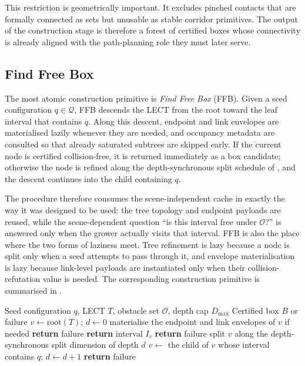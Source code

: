 \documentclass[journal]{IEEEtran}
\newcommand{\calO}{\ensuremath{\mathcal{O}}}
\newcommand{\Q}{\ensuremath{\mathcal{Q}}}
\begin{document}
This restriction is geometrically important. It excludes pinched contacts that
are formally connected as sets but unusable as stable corridor primitives. The
output of the construction stage is therefore a forest of certified boxes whose
connectivity is already aligned with the path-planning role they must later
serve.

\subsection{Find Free Box}\label{sec:forest_ffb}

The most atomic construction primitive is \emph{Find Free Box} (FFB). Given a
seed configuration $q\in\Q$, FFB descends the LECT from the root toward the
leaf interval that contains $q$. Along this descent, endpoint and link
envelopes are materialised lazily whenever they are needed, and occupancy
metadata are consulted so that already saturated subtrees are skipped early.
If the current node is certified collision-free, it is returned immediately as
a box candidate; otherwise the node is refined along the depth-synchronous
split schedule of , and the descent continues into the
child containing $q$.

The procedure therefore consumes the scene-independent cache in exactly the way
it was designed to be used: the tree topology and endpoint payloads are reused,
while the scene-dependent question ``is this interval free under $\calO$?'' is
answered only when the grower actually visits that interval. FFB is also the
place where the two forms of laziness meet. Tree refinement is lazy because a
node is split only when a seed attempts to pass through it, and envelope
materialisation is lazy because link-level payloads are instantiated only when
their collision-refutation value is needed. The corresponding construction
primitive is summarised in .

\begin{algorithm}[t]
\caption{Find Free Box}
\label{alg:ffb_rewrite}
\footnotesize
\begin{algorithmic}[1]
\REQUIRE Seed configuration $q$, LECT $T$, obstacle set $\calO$, depth cap $D_{\max}$
\ENSURE Certified box $B$ or failure
\STATE $v \gets \mathrm{root}(T)$; $d \gets 0$
  \STATE materialise the endpoint and link envelopes of $v$ if needed
    \STATE \textbf{return} failure
  \ENDIF
  \IF{$v$ is certified collision-free with respect to $\calO$}
    \STATE \textbf{return} interval $I_v$
  \ENDIF
    \STATE \textbf{return} failure
  \ENDIF
    \STATE split $v$ along the depth-synchronous split dimension of depth $d$
  \ENDIF
  \STATE $v \gets$ the child of $v$ whose interval contains $q$; $d \gets d+1$
\ENDWHILE
\STATE \textbf{return} failure
\end{algorithmic}
\end{algorithm}
\end{document}
